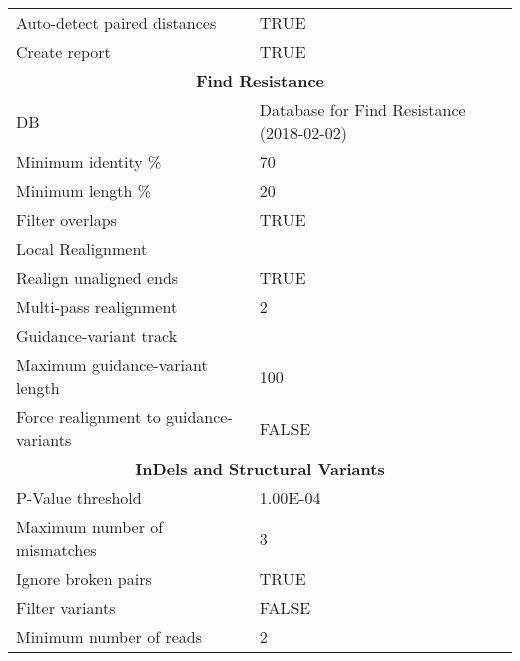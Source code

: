 \begin{scriptsize}
\begin{center}
\begin{longtable}{ll}
Auto-detect paired distances                 & TRUE                                           \\
Create report                                & TRUE                                           \\
\midrule
\multicolumn{2}{c}{\textbf{Find Resistance}}                                                           \\\midrule
DB                                           & Database for Find Resistance (2018-02-02)      \\
Minimum identity \%                          & 70                                             \\
Minimum length \%                            & 20                                             \\
Filter overlaps                              & TRUE                                           \\
Local Realignment                            &                                                \\
Realign unaligned ends                       & TRUE                                           \\
Multi-pass realignment                       & 2                                              \\
Guidance-variant track                       &                                                \\
Maximum guidance-variant length              & 100                                            \\
Force realignment to guidance-variants       & FALSE                                          \\
\midrule
\multicolumn{2}{c}{\textbf{InDels and Structural Variants}}                                                           \\\midrule
P-Value threshold                            & 1.00E-04                                       \\
Maximum number of mismatches                 & 3                                              \\
Ignore broken pairs                          & TRUE                                           \\
Filter variants                              & FALSE                                          \\
Minimum number of reads                      & 2                                              \\

\end{longtable}
\end{center}
\end{scriptsize}
